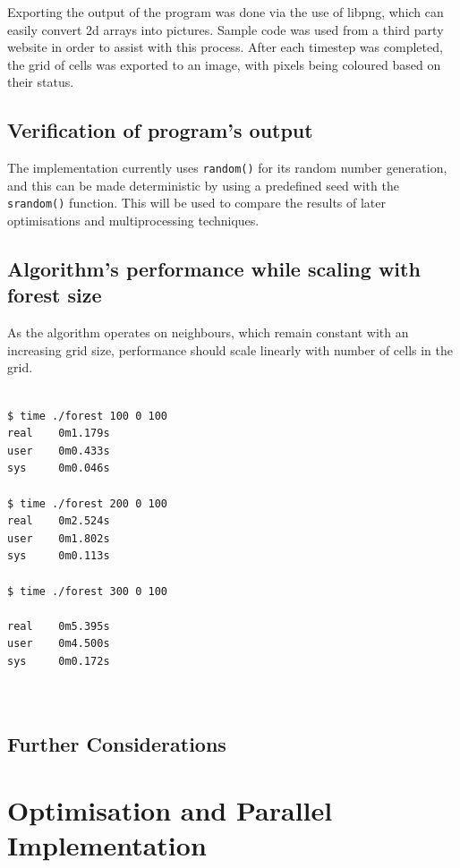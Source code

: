 \documentclass[11pt,a4paper]{report}
\begin{document}
Exporting the output of the program was done via the use of
libpng\cite{libpng}, which can easily convert 2d arrays into pictures. Sample
code was used from a third party website in order to assist with this
process\cite{png}. After each timestep was completed, the grid of cells was
exported to an image, with pixels being coloured based on their status.

\newpage
\section{Verification of program's output}

The implementation currently uses \texttt{random()} for its random number
generation, and this can be made deterministic by using a predefined seed with
the \texttt{srandom()} function. This will be used to compare the results of
later optimisations and multiprocessing techniques.

\newpage
\section{Algorithm's performance while scaling with forest size}

As the algorithm operates on neighbours, which remain constant with an
increasing grid size, performance should scale linearly with number of cells in
the grid.

\begin{verbatim}

$ time ./forest 100 0 100
real    0m1.179s
user    0m0.433s
sys     0m0.046s

$ time ./forest 200 0 100
real    0m2.524s
user    0m1.802s
sys     0m0.113s

$ time ./forest 300 0 100

real    0m5.395s
user    0m4.500s
sys     0m0.172s



\end{verbatim}

\newpage
\section{Further Considerations}

\newpage

\chapter{Optimisation and Parallel Implementation}
\end{document}

